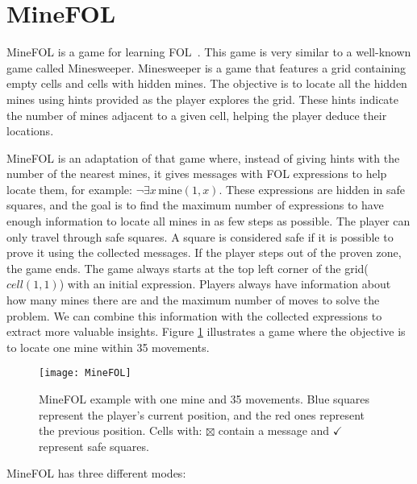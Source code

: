 \section{MineFOL}

MineFOL is a game for learning \gls{FOL}~\cite{groza_minefol}. This game is very similar to a well-known game called Minesweeper. Minesweeper is a game that features a grid containing empty cells and cells with hidden mines. The objective is to locate all the hidden mines using hints provided as the player explores the grid. These hints indicate the number of mines adjacent to a given cell, helping the player deduce their locations. 

MineFOL is an adaptation of that game where, instead of giving hints with the number of the nearest mines, it gives messages with \gls{FOL} expressions to help locate them, for example: \(\neg \exists x \, \text{mine}(1, x)\). These expressions are hidden in safe squares, and the goal is to find the maximum number of expressions to have enough information to locate all mines in as few steps as possible. The player can only travel through safe squares. A square is considered safe if it is possible to prove it using the collected messages. If the player steps out of the proven zone, the game ends. The game always starts at the top left corner of the grid(\(cell(1,1)\)) with an initial expression. Players always have information about how many mines there are and the maximum number of moves to solve the problem. We can combine this information with the collected expressions to extract more valuable insights. Figure \ref{img:minefol} illustrates a game where the objective is to locate one mine within 35 movements.

\begin{figure}[htbp]
    \centering
    \texttt{[image: MineFOL]}
    \caption{MineFOL example with one mine and 35 movements. Blue squares represent the player's current position, and the red ones represent the previous position. Cells with: \(\boxtimes\) contain a message and \( \checkmark \) represent safe squares.}
    \label{img:minefol}
\end{figure}

MineFOL has three different modes:

